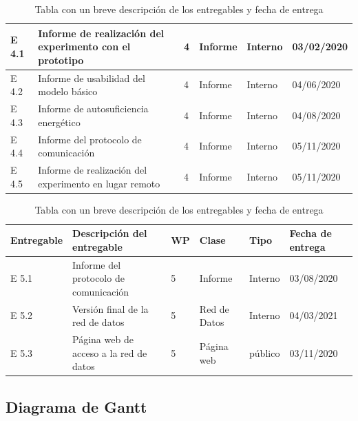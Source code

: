 \documentclass[11pt]{extarticle}
\begin{document}
\begin{table}[H]
\begin{tabular}{p{2.4cm} p{4.5cm} p{0.7cm} p{1.0cm} p{1.0cm} p{2.0cm}}
					    E 4.1 & Informe de realización del experimento con el prototipo & 4 & Informe & Interno & 03/02/2020 \\ \hline
					    E 4.2 & Informe de usabilidad del modelo básico & 4 & Informe & Interno & 04/06/2020 \\ \hline
					    E 4.3 & Informe de autosuficiencia energético & 4 & Informe & Interno & 04/08/2020 \\ \hline
					    E 4.4 & Informe del protocolo de comunicación & 4 & Informe & Interno & 05/11/2020 \\ \hline
					    E 4.5 & Informe de realización del experimento en lugar remoto & 4 & Informe & Interno & 05/11/2020 \\ \hline \hline
				    \end{tabular}
				    \caption{\label{tab:Entregables1} Tabla con un breve descripción de los entregables y fecha de entrega}
				\end{table}

				\begin{table}[H]
				    \centering
					\begin{tabular}{p{2.4cm} p{4.5cm} p{0.7cm} p{2.0cm} p{1.0cm} p{2.0cm}}
						\hline
						\multicolumn{1}{m{2.4cm}}{\centering \textbf{Entregable}} &  
						\multicolumn{1}{m{4.5cm}}{\centering \textbf{Descripción del entregable}} &           \multicolumn{1}{m{0.7cm}}{\centering \textbf{WP}} & 
				        \multicolumn{1}{m{2.0cm}}{\textbf{Clase}}  &
					    \multicolumn{1}{m{1.8cm}}{\textbf{Tipo}} &     	         \multicolumn{1}{m{2.0cm}}{\centering \textbf{Fecha de entrega}} \\ \hline
					    \hline
					    E 5.1 & Informe del protocolo de comunicación & 5 & Informe & Interno & 03/08/2020 \\ \hline
					    E 5.2 & Versión final de la red de datos & 5 & Red de Datos & Interno & 04/03/2021 \\ \hline
					    E 5.3 & Página web de acceso a la red de datos & 5 & Página web & público & 03/11/2020 \\ \hline \hline
				    \end{tabular}
					\caption{\label{tab:Entregables2} Tabla con un breve descripción de los entregables y fecha de entrega}
				\end{table}

			\subsection{Diagrama de Gantt}
				\label{SubSec:}
\end{document}
